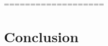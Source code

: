 \documentclass{article}
\begin{document}
===================













\section{Conclusion} %
\label{sec:conclusion}




\end{document}

